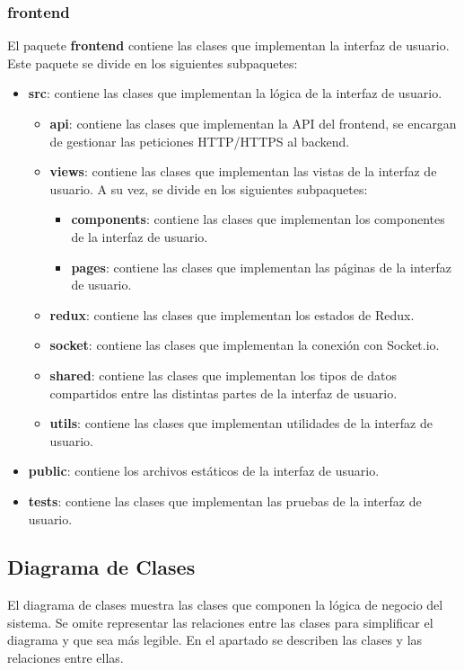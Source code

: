 \subsubsection{frontend}
El paquete \textbf{frontend} contiene las clases que implementan la interfaz de usuario. Este paquete se divide en los siguientes subpaquetes:
\begin{itemize} 
    \item \textbf{src}: contiene las clases que implementan la lógica de la interfaz de usuario.
    \begin{itemize}
        \item \textbf{api}: contiene las clases que implementan la API del frontend, se encargan de gestionar las peticiones HTTP/HTTPS al backend.
        \item \textbf{views}: contiene las clases que implementan las vistas de la interfaz de usuario. A su vez, se divide en los siguientes subpaquetes:
        \begin{itemize}
            \item \textbf{components}: contiene las clases que implementan los componentes de la interfaz de usuario.
            \item \textbf{pages}: contiene las clases que implementan las páginas de la interfaz de usuario.
        \end{itemize}
        \item \textbf{redux}: contiene las clases que implementan los estados de Redux.
        \item \textbf{socket}: contiene las clases que implementan la conexión con Socket.io.
        \item \textbf{shared}: contiene las clases que implementan los tipos de datos compartidos entre las distintas partes de la interfaz de usuario.
        \item \textbf{utils}: contiene las clases que implementan utilidades de la interfaz de usuario.
    \end{itemize}
    \item \textbf{public}: contiene los archivos estáticos de la interfaz de usuario.
    \item \textbf{tests}: contiene las clases que implementan las pruebas de la interfaz de usuario.
\end{itemize}

\subsection{Diagrama de Clases} 
El diagrama de clases muestra las clases que componen la lógica de negocio del sistema. Se omite representar las relaciones entre las clases para simplificar el diagrama y que sea más legible. En el apartado 
se describen las clases y las relaciones entre ellas.

